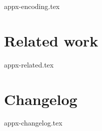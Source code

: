 \documentclass{article}
\begin{document}
{appx-encoding.tex}

\newpage
\section{Related work}
\label{appx:related}

{appx-related.tex}

\newpage
\section{Changelog}
\label{appx:changelog}

{appx-changelog.tex}

\end{document}
